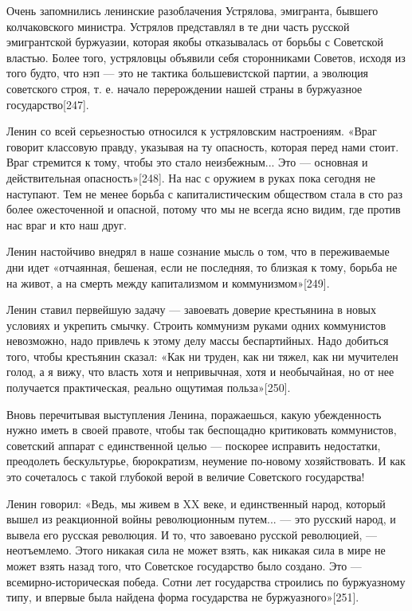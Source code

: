 \documentclass[12pt, a4paper, openany]{book}
\begin{document}
Очень запомнились ленинские разоблачения Устрялова, эмигранта, бывшего колчаковского министра. Устрялов представлял в те дни часть русской эмигрантской буржуазии, которая якобы отказывалась от борьбы с Советской властью. Более того, устряловцы объявили себя сторонниками Советов, исходя из того будто, что нэп — это не тактика большевистской партии, а эволюция советского строя, т. е. начало перерождении нашей страны в буржуазное государство[247].

Ленин со всей серьезностью относился к устряловским настроениям. «Враг говорит классовую правду, указывая на ту опасность, которая перед нами стоит. Враг стремится к тому, чтобы это стало неизбежным... Это — основная и действительная опасность»[248]. На нас с оружием в руках пока сегодня не наступают. Тем не менее борьба с капиталистическим обществом стала в сто раз более ожесточенной и опасной, потому что мы не всегда ясно видим, где против нас враг и кто наш друг.

Ленин настойчиво внедрял в наше сознание мысль о том, что в переживаемые дни идет «отчаянная, бешеная, если не последняя, то близкая к тому, борьба не на живот, а на смерть между капитализмом и коммунизмом»[249].

Ленин ставил первейшую задачу — завоевать доверие крестьянина в новых условиях и укрепить смычку. Строить коммунизм руками одних коммунистов невозможно, надо привлечь к этому делу массы беспартийных. Надо добиться того, чтобы крестьянин сказал: «Как ни труден, как ни тяжел, как ни мучителен голод, а я вижу, что власть хотя и непривычная, хотя и необычайная, но от нее получается практическая, реально ощутимая польза»[250].

Вновь перечитывая выступления Ленина, поражаешься, какую убежденность нужно иметь в своей правоте, чтобы так беспощадно критиковать коммунистов, советский аппарат с единственной целью — поскорее исправить недостатки, преодолеть бескультурье, бюрократизм, неумение по-новому хозяйствовать. И как это сочеталось с такой глубокой верой в величие Советского государства!

Ленин говорил: «Ведь, мы живем в XX веке, и единственный народ, который вышел из реакционной войны революционным путем... — это русский народ, и вывела его русская революция. И то, что завоевано русской революцией, — неотъемлемо. Этого никакая сила не может взять, как никакая сила в мире не может взять назад того, что Советское государство было создано. Это — всемирно-историческая победа. Сотни лет государства строились по буржуазному типу, и впервые была найдена форма государства не буржуазного»[251].
\end{document}
